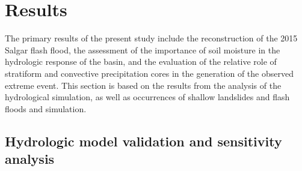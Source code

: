 \documentclass[hess, manuscript]{copernicus}
\begin{document}
\section{Results}
\label{sec:results}

The primary results of the present study include the reconstruction of the 2015 Salgar flash flood, the assessment of the importance of soil moisture in the hydrologic response of the basin, and the evaluation of the relative role of stratiform and convective precipitation cores in the generation of the observed extreme event. This section is based on the results from the analysis of the hydrological simulation, as well as occurrences of shallow landslides and flash floods and simulation. \\

\subsection{Hydrologic model validation and sensitivity analysis}
\end{document}

